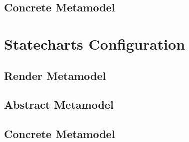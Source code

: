 \subsection*{Concrete Metamodel}
\raggedbottom



\section{Statecharts Configuration}
\label{app:state}
\subsection*{Render Metamodel}


\subsection*{Abstract Metamodel}


\subsection*{Concrete Metamodel}
